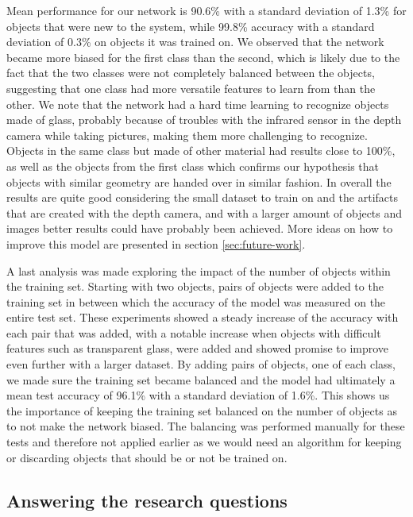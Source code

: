Mean performance for our network is 90.6\% with a standard deviation of 1.3\% for objects that were new to the system, while 99.8\% accuracy with a standard deviation of 0.3\% on objects it was trained on. We observed that the network became more biased for the first class than the second, which is likely due to the fact that the two classes were not completely balanced between the objects, suggesting that one class had more versatile features to learn from than the other. We note that the network had a hard time learning to recognize objects made of glass, probably because of troubles with the infrared sensor in the depth camera while taking pictures, making them more challenging to recognize. Objects in the same class but made of other material had results close to 100\%, as well as the objects from the first class which confirms our hypothesis that objects with similar geometry are handed over in similar fashion. In overall the results are quite good considering the small dataset to train on and the artifacts that are created with the depth camera, and with a larger amount of objects and images better results could have probably been achieved. More ideas on how to improve this model are presented in section \ref{sec:future-work}.

A last analysis was made exploring the impact of the number of objects within the training set. Starting with two objects, pairs of objects were added to the training set in between which the accuracy of the model was measured on the entire test set. These experiments showed a steady increase of the accuracy with each pair that was added, with a notable increase when objects with difficult features such as transparent glass, were added and showed promise to improve even further with a larger dataset. By adding pairs of objects, one of each class, we made sure the training set became balanced and the model had ultimately a mean test accuracy of 96.1\% with a standard deviation of 1.6\%. This shows us the importance of keeping the training set balanced on the number of objects as to not make the network biased. The balancing was performed manually for these tests and therefore not applied earlier as we would need an algorithm for keeping or discarding objects that should be or not be trained on.



\subsection*{Answering the research questions}


